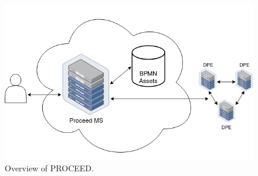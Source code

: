 \begin{figure}[H]
    \centering
    \includegraphics[scale=0.45]{images/quick-ms-overview.drawio.png}
    \caption{Overview of PROCEED.}
    \label{fig:proceed-overview}
    \vspace{-1em} %
\end{figure}




